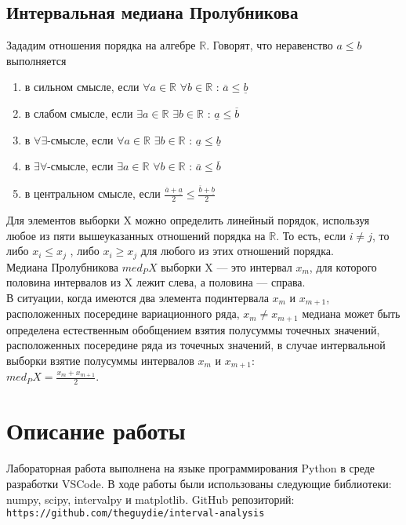 \documentclass[a4paper, 12pt]{article}
\begin{document}
\subsection{Интервальная медиана Пролубникова}
Зададим отношения порядка на алгебре $\mathbb{R}$. Говорят, что неравенство $a \leq b$ выполняется\\
\begin{enumerate}
    \item в сильном смысле, если $\forall a \in \mathbb{R}$ $ \forall b \in \mathbb{R}$ : $\overline{a} \leq \underline{b}$
    \item в слабом смысле, если $\exists a \in \mathbb{R}$ $ \exists b \in \mathbb{R}$ : $\underline{a} \leq \overline{b}$
    \item в $\forall \exists$-смысле, если $\forall a \in \mathbb{R} $ $ \exists b \in \mathbb{R}$ : $\underline{a} \leq \underline{b}$
    \item в $\exists \forall$-смысле, если $\exists a \in \mathbb{R}$ $\forall b \in \mathbb{R}$ : $\overline{a} \leq \overline{b}$
    \item в центральном смысле, если $\frac{\overline{a} + \underline{a}}{2} \leq \frac{\overline{b} + \underline{b}}{2}$
\end{enumerate}
Для элементов выборки X можно определить линейный порядок, используя любое из пяти
вышеуказанных отношений порядка на $\mathbb{R}$. То есть, если $i \neq j$, то либо $x_i \leq x_j$ , либо $x_i \geq x_j$ для любого из этих отношений порядка.\\
Медиана Пролубникова $med_{P}{X}$ выборки X — это интервал $x_m$, для которого половина интервалов из X лежит слева, а половина — справа.\\
В ситуации, когда имеются два элемента подинтервала $x_m$ и $x_{m + 1}$, расположенных посередине вариационного ряда, $x_m \neq x_{m + 1}$ медиана может быть определена естественным обобщением взятия полусуммы точечных значений, расположенных посередине ряда из точечных значений, в случае интервальной выборки взятие полусуммы интервалов $x_m$ и $x_{m + 1}$:\\
$med_{P}{X} = \frac{x_m + x_{m + 1}}{2}$.

\section{Описание работы}

Лабораторная работа выполнена на языке программирования Python в среде разработки VSCode. В ходе работы были использованы следующие библиотеки: numpy, scipy, intervalpy
и matplotlib. GitHub репозиторий: \texttt{https://github.com/theguydie/interval-analysis}
\end{document}
